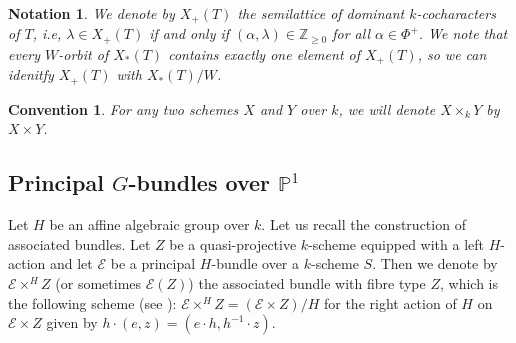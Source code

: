 \documentclass{amsart}
\newcommand{\cE}{\mathcal{E}}
\theoremstyle{plain}
\newtheorem{convention}{Convention}[section]
\newtheorem{notation}{Notation}[section]
\theoremstyle{definition}
\theoremstyle{remark}
\begin{document}
\begin{notation}
We denote by $X_{+}(T)$ the semilattice of dominant $k$-cocharacters of $T$, i.e, $\lambda\in X_{+}(T)$ if and only if $(\alpha,\lambda)\in\mathbb{Z}_{\geq 0}$ for all $\alpha\in\Phi^{+}$. We note that every $W$-orbit of $X_{*}(T)$ contains exactly one element of $X_{+}(T)$, so we can idenitfy $X_{+}(T)$ with $X_{*}(T)/W$.
\end{notation}
\begin{convention}
For any two schemes $X$ and $Y$ over $k$, we will denote $X\times_{k}Y$ by $X\times Y$.
\end{convention}
\subsection{Principal $G$-bundles over $\mathbb{P}^{1}$}\label{basic_principal bundles} 
Let $H$ be an affine algebraic group over $k$. Let us recall the construction of associated bundles. 
Let $Z$ be a quasi-projective $k$-scheme equipped with a left $H$-action and let $\cE$ be a principal $H$-bundle over a $k$-scheme $S$. 
Then we denote by $\cE\times^{H}Z$ (or sometimes $\cE(Z)$) the associated bundle with fibre type $Z$, which is the following scheme (see \cite[Proposition 3.1]{Fed2}): $\cE\times^{H}Z=(\cE\times Z)/H$ for the right action of $H$ on $\cE\times Z$ given by $h\cdot(e,z)=(e\cdot h,h^{-1}\cdot z)$.
\end{document}
